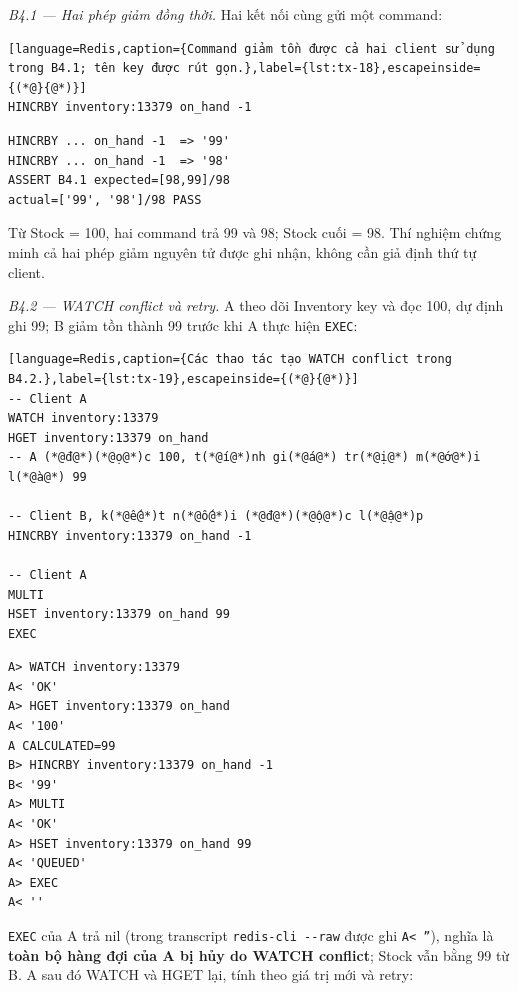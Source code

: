 \emph{B4.1 — Hai phép giảm đồng thời.} Hai kết nối cùng gửi một command:

\begin{lstlisting}[language=Redis,caption={Command giảm tồn được cả hai client sử dụng trong B4.1; tên key được rút gọn.},label={lst:tx-18},escapeinside={(*@}{@*)}]
HINCRBY inventory:13379 on_hand -1
\end{lstlisting}

\begingroup
{}\label{result:tx-12}
\nopagebreak[4]
\begin{Verbatim}
HINCRBY ... on_hand -1  => '99'
HINCRBY ... on_hand -1  => '98'
ASSERT B4.1 expected=[98,99]/98
actual=['99', '98']/98 PASS
\end{Verbatim}
\endgroup\par\smallskip
Từ Stock = 100, hai command trả 99 và 98; Stock cuối = 98. Thí nghiệm chứng minh cả hai phép giảm nguyên tử được ghi nhận, không cần giả định thứ tự client.

\emph{B4.2 — WATCH conflict và retry.} A theo dõi Inventory key và đọc 100, dự định ghi 99; B giảm tồn thành 99 trước khi A thực hiện \texttt{EXEC}:

\begin{lstlisting}[language=Redis,caption={Các thao tác tạo WATCH conflict trong B4.2.},label={lst:tx-19},escapeinside={(*@}{@*)}]
-- Client A
WATCH inventory:13379
HGET inventory:13379 on_hand
-- A (*@đ@*)(*@ọ@*)c 100, t(*@í@*)nh gi(*@á@*) tr(*@ị@*) m(*@ớ@*)i l(*@à@*) 99

-- Client B, k(*@ế@*)t n(*@ố@*)i (*@đ@*)(*@ộ@*)c l(*@ậ@*)p
HINCRBY inventory:13379 on_hand -1

-- Client A
MULTI
HSET inventory:13379 on_hand 99
EXEC
\end{lstlisting}

\begingroup
{}\label{result:tx-13}
\nopagebreak[4]
\begin{Verbatim}
A> WATCH inventory:13379
A< 'OK'
A> HGET inventory:13379 on_hand
A< '100'
A CALCULATED=99
B> HINCRBY inventory:13379 on_hand -1
B< '99'
A> MULTI
A< 'OK'
A> HSET inventory:13379 on_hand 99
A< 'QUEUED'
A> EXEC
A< ''
\end{Verbatim}
\endgroup\par\smallskip
\texttt{EXEC} của A trả nil (trong transcript \texttt{redis-\allowbreak{}cli -\allowbreak{}-\allowbreak{}raw} được ghi \texttt{A< ''}), nghĩa là \textbf{toàn bộ hàng đợi của A bị hủy do WATCH conflict}; Stock vẫn bằng 99 từ B. A sau đó WATCH và HGET lại, tính theo giá trị mới và retry:

